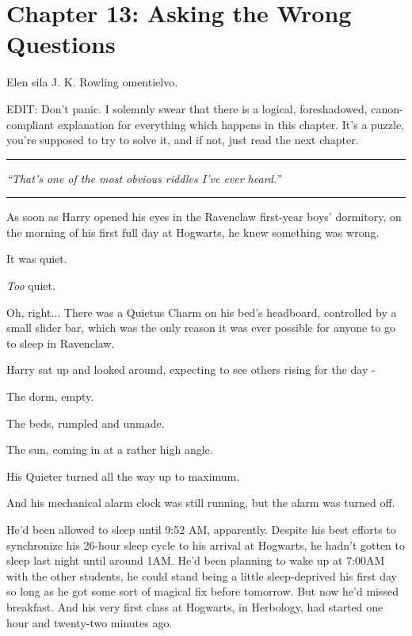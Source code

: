 \chapter{Chapter 13: Asking the Wrong Questions}
Elen sila J. K. Rowling omentielvo.

EDIT: Don't panic. I solemnly swear that there is a logical,
foreshadowed, canon-compliant explanation for everything which happens
in this chapter. It's a puzzle, you're supposed to try to solve it, and
if not, just read the next chapter.

\begin{center}\rule{3in}{0.4pt}\end{center}

\emph{``That's one of the most obvious riddles I've ever heard.''}

\begin{center}\rule{3in}{0.4pt}\end{center}

As soon as Harry opened his eyes in the Ravenclaw first-year boys'
dormitory, on the morning of his first full day at Hogwarts, he knew
something was wrong.

It was quiet.

\emph{Too} quiet.

Oh, right... There was a Quietus Charm on his bed's headboard,
controlled by a small slider bar, which was the only reason it was ever
possible for anyone to go to sleep in Ravenclaw.

Harry sat up and looked around, expecting to see others rising for the
day -

The dorm, empty.

The beds, rumpled and unmade.

The sun, coming in at a rather high angle.

His Quieter turned all the way up to maximum.

And his mechanical alarm clock was still running, but the alarm was
turned off.

He'd been allowed to sleep until 9:52 AM, apparently. Despite his best
efforts to synchronize his 26-hour sleep cycle to his arrival at
Hogwarts, he hadn't gotten to sleep last night until around 1AM. He'd
been planning to wake up at 7:00AM with the other students, he could
stand being a little sleep-deprived his first day so long as he got some
sort of magical fix before tomorrow. But now he'd missed breakfast. And
his very first class at Hogwarts, in Herbology, had started one hour and
twenty-two minutes ago.

